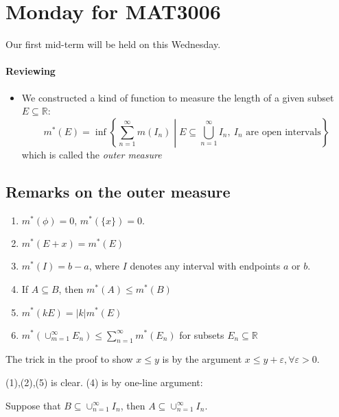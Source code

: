 \section{Monday for MAT3006}
Our first mid-term will be held on this Wednesday.
\paragraph{Reviewing}
\begin{itemize}
\item
We constructed a kind of function to measure the length of a given subset $E\subseteq\mathbb{R}$:
\[
m^*(E)=\inf\left\{
\sum_{n=1}^\infty m(I_n)\middle|
E\subseteq\bigcup_{n=1}^\infty I_n,\ \text{$I_n$ are open intervals}
\right\}
\]
which is called the \emph{outer measure}
\end{itemize}
\subsection{Remarks on the outer measure}
\begin{proposition}\label{pro:7:8}
\begin{enumerate}
\item
$m^*(\phi)=0$, $m^*(\{x\})=0$.
\item
$m^*(E+x) = m^*(E)$
\item
$m^*(I) = b-a$, where $I$ denotes any interval with endpoints $a$ or $b$.
\item
If $A\subseteq B$, then $m^*(A)\le m^*(B)$
\item
$m^*(kE) = |k|m^*(E)$
\item
$m^*(\cup_{m=1}^\infty E_n)\le \sum_{n=1}^\infty m^*(E_n)$ for subsets $E_n\subseteq\mathbb{R}$
\end{enumerate}
\end{proposition}
\begin{remark}
The trick in the proof to show $x\le y$ is by the argument $x\le y+\varepsilon,\forall \varepsilon>0$.
\end{remark}
(1),(2),(5) is clear.
(4) is by one-line argument: 

Suppose that $B\subseteq\cup_{n=1}^\infty I_n$, then $A\subseteq\cup_{n=1}^\infty I_n$.

